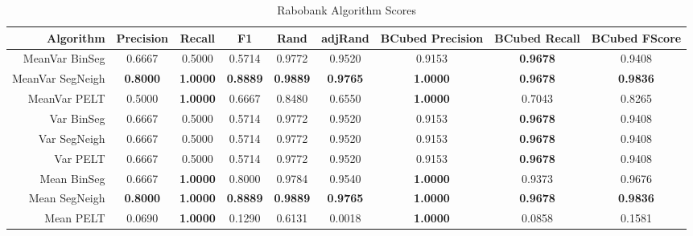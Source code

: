 \documentclass{uvamscse}	%
\begin{document}
\begin{table}[H]
\centering
\label{tbl:rabo}
\begin{adjustbox}{width=1\textwidth}
\begin{tabular}{rcccccccc}
\hline
\textbf{Algorithm} & \textbf{Precision} & \textbf{Recall} & \textbf{F1}     & \textbf{Rand}   & \textbf{adjRand} & \textbf{BCubed Precision} & \textbf{BCubed Recall} & \textbf{BCubed FScore} \\ \hline
MeanVar BinSeg     & 0.6667             & 0.5000          & 0.5714          & 0.9772          & 0.9520           & 0.9153                    & \textbf{0.9678}        & 0.9408                 \\ \hline
MeanVar SegNeigh   & \textbf{0.8000}    & \textbf{1.0000} & \textbf{0.8889} & \textbf{0.9889} & \textbf{0.9765}  & \textbf{1.0000}           & \textbf{0.9678}        & \textbf{0.9836}        \\ \hline
MeanVar PELT       & 0.5000             & \textbf{1.0000} & 0.6667          & 0.8480          & 0.6550           & \textbf{1.0000}           & 0.7043                 & 0.8265                 \\ \hline
Var BinSeg         & 0.6667             & 0.5000          & 0.5714          & 0.9772          & 0.9520           & 0.9153                    & \textbf{0.9678}        & 0.9408                 \\ \hline
Var SegNeigh       & 0.6667             & 0.5000          & 0.5714          & 0.9772          & 0.9520           & 0.9153                    & \textbf{0.9678}        & 0.9408                 \\ \hline
Var PELT           & 0.6667             & 0.5000          & 0.5714          & 0.9772          & 0.9520           & 0.9153                    & \textbf{0.9678}        & 0.9408                 \\ \hline
Mean BinSeg        & 0.6667             & \textbf{1.0000} & 0.8000          & 0.9784          & 0.9540           & \textbf{1.0000}           & 0.9373                 & 0.9676                 \\ \hline
Mean SegNeigh      & \textbf{0.8000}    & \textbf{1.0000} & \textbf{0.8889} & \textbf{0.9889} & \textbf{0.9765}  & \textbf{1.0000}           & \textbf{0.9678}        & \textbf{0.9836}        \\ \hline
Mean PELT          & 0.0690             & \textbf{1.0000} & 0.1290          & 0.6131          & 0.0018           & \textbf{1.0000}           & 0.0858                 & 0.1581                 \\ \hline
\end{tabular}
\end{adjustbox}
\caption{Rabobank Algorithm Scores}
\end{table}
\end{document}

